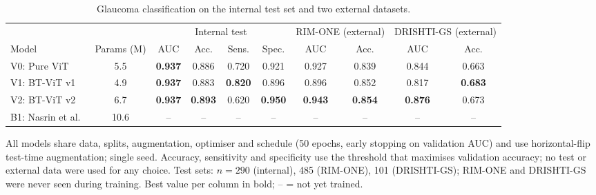 \documentclass[10pt]{article}
\begin{document}
\begin{table}[h]
\centering
\begin{threeparttable}
\caption{Glaucoma classification on the internal test set and two external datasets.}
\label{tab:results}
\small
\setlength{\tabcolsep}{4.5pt}
\begin{tabular}{@{}lc cccc cc cc@{}}
\toprule
 & & \multicolumn{4}{c}{Internal test} & \multicolumn{2}{c}{RIM-ONE (external)} & \multicolumn{2}{c}{DRISHTI-GS (external)} \\
\cmidrule(lr){3-6} \cmidrule(lr){7-8} \cmidrule(l){9-10}
Model & Params (M) & AUC & Acc. & Sens. & Spec. & AUC & Acc. & AUC & Acc. \\
\midrule
V0: Pure ViT & 5.5 & \textbf{0.937} & 0.886 & 0.720 & 0.921 & 0.927 & 0.839 & 0.844 & 0.663 \\
V1: BT-ViT v1 & 4.9 & \textbf{0.937} & 0.883 & \textbf{0.820} & 0.896 & 0.896 & 0.852 & 0.817 & \textbf{0.683} \\
V2: BT-ViT v2 & 6.7 & \textbf{0.937} & \textbf{0.893} & 0.620 & \textbf{0.950} & \textbf{0.943} & \textbf{0.854} & \textbf{0.876} & 0.673 \\
B1: Nasrin et al.~\cite{nasrin2026} & 10.6 & -- & -- & -- & -- & -- & -- & -- & -- \\
\bottomrule
\end{tabular}
\begin{tablenotes}\footnotesize
\item[] All models share data, splits, augmentation, optimiser and schedule (50 epochs, early stopping on
validation AUC) and use horizontal-flip test-time augmentation; single seed. Accuracy, sensitivity and
specificity use the threshold that maximises validation accuracy; no test or external data were used for
any choice. Test sets: $n = 290$ (internal), 485 (RIM-ONE), 101 (DRISHTI-GS); RIM-ONE and DRISHTI-GS were
never seen during training. Best value per column in bold; -- = not yet trained.
\end{tablenotes}
\end{threeparttable}
\end{table}
\end{document}
